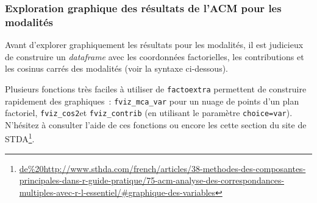 \documentclass[
  11pt,
  french,
]{book}
\makeatletter
\newenvironment{Shaded}{\begin{snugshade}}{\end{snugshade}}
\newcommand{\DataTypeTok}[1]{\textcolor[rgb]{0.13,0.29,0.53}{#1}}
\newcommand{\DecValTok}[1]{\textcolor[rgb]{0.00,0.00,0.81}{#1}}
\newcommand{\KeywordTok}[1]{\textcolor[rgb]{0.13,0.29,0.53}{\textbf{#1}}}
\newcommand{\NormalTok}[1]{#1}
\newcommand{\OperatorTok}[1]{\textcolor[rgb]{0.81,0.36,0.00}{\textbf{#1}}}
\newcommand{\StringTok}[1]{\textcolor[rgb]{0.31,0.60,0.02}{#1}}
\renewcommand{\href}[2]{#2\footnote{\url{#1}}}
\newenvironment{kframe}{%
\medskip{}
\setlength{\fboxsep}{.8em}
 \def\at@end@of@kframe{}%
 \ifinner\ifhmode%
  \def\at@end@of@kframe{\end{minipage}}%
  \begin{minipage}{\columnwidth}%
 \fi\fi%
 \def\FrameCommand##1{\hskip\@totalleftmargin \hskip-\fboxsep
 \colorbox{shadecolor}{##1}\hskip-\fboxsep
     \hskip-\linewidth \hskip-\@totalleftmargin \hskip\columnwidth}%
 \MakeFramed {\advance\hsize-\width
   \@totalleftmargin\z@ \linewidth\hsize
   \@setminipage}}%
 {\par\unskip\endMakeFramed%
 \at@end@of@kframe}
\renewenvironment{Shaded}{\begin{kframe}}{\end{kframe}}
\makeatother
\begin{document}
\hypertarget{sect124213}{%
\subsubsection{Exploration graphique des résultats de l'ACM pour les modalités}\label{sect124213}}

Avant d'explorer graphiquement les résultats pour les modalités, il est judicieux de construire un \emph{dataframe} avec les coordonnées factorielles, les contributions et les cosinus carrés des modalités (voir la syntaxe ci-dessous).

\begin{Shaded}
\end{Shaded}

Plusieurs fonctions très faciles à utiliser de \texttt{factoextra} permettent de construire rapidement des graphiques~: \texttt{fviz\_mca\_var} pour un nuage de points d'un plan factoriel, \texttt{fviz\_cos2}et \texttt{fviz\_contrib} (en utilisant le paramètre \texttt{choice=var}). N'hésitez à consulter l'aide de ces fonctions ou encore les cette section du site de \href{de\%20http://www.sthda.com/french/articles/38-methodes-des-composantes-principales-dans-r-guide-pratique/75-acm-analyse-des-correspondances-multiples-avec-r-l-essentiel/\#graphique-des-variables}{STDA}.
\end{document}

